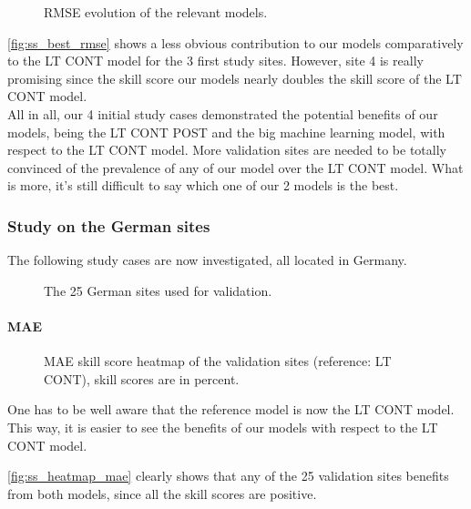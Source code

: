 \begin{figure}[htb!]
    \centering
    
\caption{RMSE evolution of the relevant models.}
\label{fig:evol_best_rmse}
\end{figure}

\autoref{fig:ss_best_rmse} shows a less obvious contribution to our models comparatively to the LT CONT model for the 3 first study sites.
However, site 4 is really promising since the skill score our models nearly doubles the  skill score of the LT CONT model. \\

All in all, our 4 initial study cases demonstrated the potential benefits of our models, being the LT CONT POST and the big machine learning model, with respect to the LT CONT model.
More validation sites are needed to be totally convinced of the prevalence of any of our model over the LT CONT model.
What is more, it's still difficult to say which one of our 2 models is the best.

\subsubsection{Study on the German sites}

The following study cases are now investigated, all located in Germany.
\begin{figure}[htb!]
    \centering
    
\caption{The 25 German sites used for validation.}

\end{figure}
\paragraph{MAE}
\begin{figure}[htb!]
    \centering
    
\caption{MAE skill score heatmap of the validation sites (reference: LT CONT), skill scores are in percent.}
\label{fig:ss_heatmap_mae}
\end{figure}

One has to be well aware that the reference model is now the LT CONT model. This way, it is easier to see the benefits of our models with respect to the LT CONT model.

\autoref{fig:ss_heatmap_mae} clearly shows that any of the 25 validation sites benefits from both models, since all the skill scores are positive.

